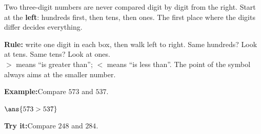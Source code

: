 \documentclass[12pt]{article}
\begin{document}

\noindent\small Two three-digit numbers are never compared digit by digit from
the right. Start at the \textbf{left}: hundreds first, then tens, then ones.
The first place where the digits differ decides everything.
\normalsize

\begin{formulabox}
\textbf{Rule:} write one digit in each box, then walk left to right.
Same hundreds? Look at tens. Same tens? Look at ones.\\[3pt]
$>$ means ``is greater than''; $<$ means ``is less than''. The point of the
symbol always aims at the smaller number.
\end{formulabox}
\begin{examplebox}
\textbf{Example:}\quad Compare $573$ and $537$.
\par
$\ans{573 > 537}$
\end{examplebox}
\begin{tryitbox}
\textbf{Try it:}\quad Compare $248$ and $284$.\\[2pt]
\end{tryitbox}
\end{document}
